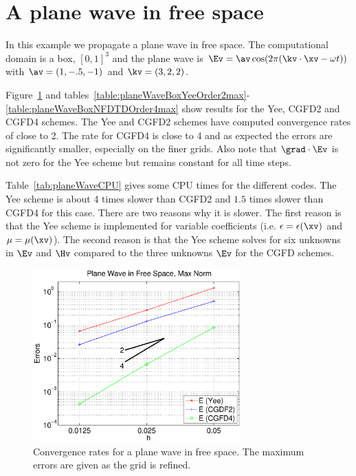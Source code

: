\documentclass[11pt]{article}
\begin{document}


\clearpage
\section{A plane wave in free space}\label{sec:planeWave}

In this example we propagate a plane wave in free space. The computational domain is a box, $[0,1]^3$
and the plane wave is $\Ev = \av \cos(2\pi(\kv\cdot\xv - \omega t) )$ with
$\av=( 1, -.5, -1)$ and $\kv=(3,2,2)$.

Figure~\ref{fig:planeWaveConvergenceRatesMaxNorm} 
and tables~\ref{table:planeWaveBoxYeeOrder2max}-\ref{table:planeWaveBoxNFDTDOrder4max} show
results for the Yee, CGFD2 and CGFD4 schemes. The Yee and CGFD2 schemes have
computed convergence rates of close to 2. The rate for CGFD4 is close to 4 and as expected the errors are
significantly smaller, especially on the finer grids. Also note that $\grad\cdot\Ev$ is not zero
for the Yee scheme but remains constant for all time steps.

Table~\ref{tab:planeWaveCPU} gives some CPU times for the different codes. The Yee scheme
is about 4 times slower than CGFD2 and $1.5$ times slower than CGFD4 for this case. There are two reasons
why it is slower. The first reason is that the Yee scheme is implemented for variable coefficients
(i.e. $\epsilon=\epsilon(\xv)$ and $\mu=\mu(\xv)$). The second reason is that the Yee scheme 
solves for six unknowns in $\Ev$ and $\Hv$ compared to the three unknowns $\Ev$ for the CGFD schemes.


\begin{figure}[hbt]
\begin{center}\small
\includegraphics[width=8cm]{planeWave/planeWaveConvergenceRatesMaxNorm.eps}
%
\caption{Convergence rates for a plane wave in free space. The maximum errors are given as the grid is refined.}
\label{fig:planeWaveConvergenceRatesMaxNorm}
\end{center}
\end{figure}
\end{document}
